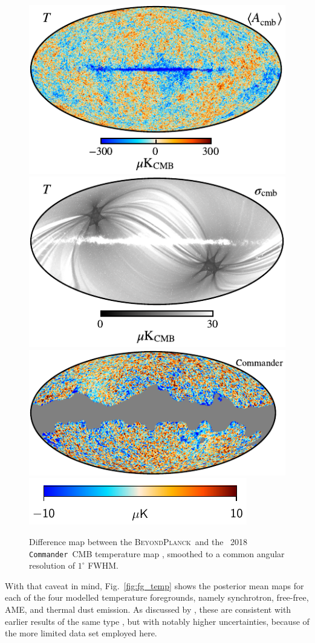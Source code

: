 \documentclass[onecolumn]{aa}
\def\commander{\texttt{Commander}}
\newcommand{\BP}{\textsc{BeyondPlanck}}
\begin{document}
\begin{figure}[t]
  \center
  \includegraphics[width=0.5\linewidth]{figs/BP_cmb_v2_I_MEAN_w8_n1024_cb_nodip_c-planck.pdf}\\
  \includegraphics[width=0.5\linewidth]{figs/BP_cmb_v2_I_STDDEV_w8_n1024_cb_c-neutral.pdf}\\  
  \includegraphics[width=0.5\linewidth]{figs/BP_cmb_diff_commander_v2_I_DIFF_w8_n1024_masked_nodip_c-planck.pdf}\\
  \includegraphics[width=0.4\linewidth]{figs/colourbar_10uK.pdf}
  \caption{Difference map between the \BP\ and the \Planck\ 2018
    \commander\ CMB temperature map \citep{planck2016-l04}, smoothed
    to a common angular resolution of $1^{\circ}$
    FWHM.}\label{fig:cmb_diff}
\end{figure}

With that caveat in mind, Fig.~\ref{fig:fg_temp} shows the posterior
mean maps for each of the four modelled temperature foregrounds,
namely synchrotron, free-free, AME, and thermal dust emission. As
discussed by \citet{bp13}, these are consistent with earlier results
of the same type \citep{planck2014-a12}, but with notably higher
uncertainties, because of the more limited data set employed here.
\end{document}
